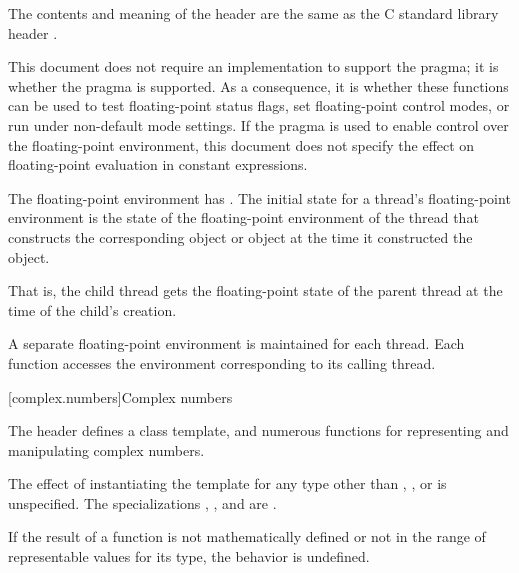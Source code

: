 \pnum
The contents and meaning of the header 
are the same as the C standard library header .
\begin{note}
This document does not require an implementation to support the
 pragma;
it is 
whether the pragma is supported. As a consequence,
it is 
whether these functions can be used to test floating-point status flags,
set floating-point control modes, or run under non-default mode settings.
If the pragma is used to enable control over the floating-point environment,
this document does not specify the effect on
floating-point evaluation in constant expressions.
\end{note}

\pnum
The floating-point environment has .
The initial state for a thread's floating-point
environment is the state of the floating-point environment of the thread that constructs
the corresponding  object
or  object
at the time it
constructed the object.
\begin{note}
That is, the child thread gets the floating-point
state of the parent thread at the time of the child's creation.
\end{note}

\pnum
A separate floating-point environment is maintained for each thread. Each function
accesses the environment corresponding to its calling thread.


[complex.numbers]{Complex numbers}

\pnum
The header  defines a class template,
and numerous functions for representing and manipulating complex numbers.

\pnum
The effect of instantiating the template
for any type other than , , or  is unspecified.
The specializations
,
, and
 are .

\pnum
If the result of a function is not mathematically defined or not in
the range of representable values for its type, the behavior is
undefined.

